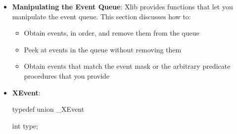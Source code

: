 \documentclass{report}
\begin{document}
\begin{itemize}
            \bigbreak \noindent 
            To check the number of events in the event queue, use XEventsQueued
            \bigbreak \noindent 
            \begin{cppcode}
                int XEventsQueued(Display* display, int mode)
            \end{cppcode}
            \bigbreak \noindent 
            If mode is QueuedAlready, XEventsQueued returns the number of events already in the event queue (and never performs a system call). If mode is QueuedAfterFlush, XEventsQueued returns the number of events already in the queue if the number is nonzero. If there are no events
            \bigbreak \noindent 
            in the queue, XEventsQueued flushes the output buffer, attempts to read more events out of the application’s connection, and returns the number read. If mode is QueuedAfterReading, XEventsQueued returns the number of events already in the queue if the number is nonzero. If there are no events in the queue, XEventsQueued attempts to read more events out of the application’s connection without flushing the output buffer and returns the number read.
            \bigbreak \noindent 
            XEventsQueued always returns immediately without I/O if there are events already in the queue. XEventsQueued with mode QueuedAfterFlush is identical in behavior to XPending. XEventsQueued with mode QueuedAlready is identical to the XQLength function.
            \bigbreak \noindent 
            To return the number of events that are pending, use XPending.
            \bigbreak \noindent 
            \begin{cppcode}
            int XPending(Display* display);
            \end{cppcode}
            \bigbreak \noindent 
            The XPending function returns the number of events that have been received from the X server but have not been removed from the event queue. XPending is identical to XEventsQueued with the mode QueuedAfterFlush specified.
        \item \textbf{Manipulating the Event Queue}: Xlib provides functions that let you manipulate the event queue. This section discusses how to:
            \begin{itemize}
                \item Obtain events, in order, and remove them from the queue
                \item Peek at events in the queue without removing them
                \item Obtain events that match the event mask or the arbitrary predicate procedures that you provide
            \end{itemize}
        \item \textbf{XEvent}:
            \bigbreak \noindent 
            \begin{cppcode}
                typedef union _XEvent {
                    int type;

}
\end{cppcode}
\end{itemize}
\end{document}

